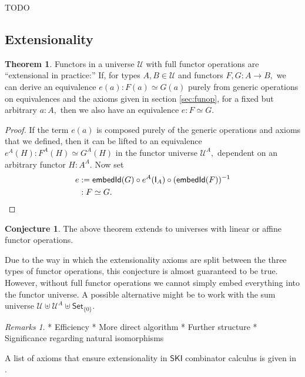 \documentclass[a4paper]{article}
\theoremstyle{definition}
\newtheorem{theorem}[definition]{Theorem}
\newtheorem{conjecture}[definition]{Conjecture}
\theoremstyle{remark}
\newtheorem*{remarks}{Remarks}
\renewcommand{\equiv}{\simeq}
\newcommand{\U}{\mathcal{U}}
\newcommand{\nm}{\mathsf}
\newcommand{\universe}{\nm}
\newcommand{\Set}{\universe{Set}}
\newcommand{\combinator}{\nm}
\newcommand{\idFun}{\combinator{I}}
\begin{document}
TODO

\subsection{Extensionality}
\label{sec:extensionality}

\begin{theorem}
  \label{thm:extensionality}
  Functors in a universe $\U$ with full functor operations are ``extensional in practice:''
  If, for types $A,B \in \U$ and functors $F,G : A \to B,$ we can derive an equivalence
  $e(a) : F(a) \equiv G(a)$ purely from generic operations on equivalences and the
  axioms given in section \ref{sec:funop}, for a fixed but arbitrary $a : A,$ then we
  also have an equivalence $e : F \equiv G.$
\end{theorem}

\begin{proof}
  If the term $e(a)$ is composed purely of the generic operations and axioms that we
  defined, then it can be lifted to an equivalence $e^A(H) : F^A(H) \equiv G^A(H)$ in the
  functor universe $\U^A,$ dependent on an arbitrary functor $H : A^A.$ Now set
  \begin{align*}
    e &:= \nm{embedId}(G) \circ e^A(\idFun_A) \circ (\nm{embedId}(F))^{-1}\\
      &: F \equiv G. \qedhere
  \end{align*}
\end{proof}

\begin{conjecture}
  \label{conj:extensionality}
  The above theorem extends to universes with linear or affine functor operations.
\end{conjecture}

Due to the way in which the extensionality axioms are split between the three types of
functor operations, this conjecture is almost guaranteed to be true. However, without
full functor operations we cannot simply embed everything into the functor universe.
A possible alternative might be to work with the sum universe $\U \uplus \U^A \uplus \Set_{\{0\}}.$

\begin{remarks}
  * Efficiency
  * More direct algorithm
  * Further structure
  * Significance regarding natural isomorphisms

  A list of axioms that ensure extensionality in $\nm{SKI}$ combinator calculus is given
  in \cite{Extensionality}.
\end{remarks}
\end{document}
